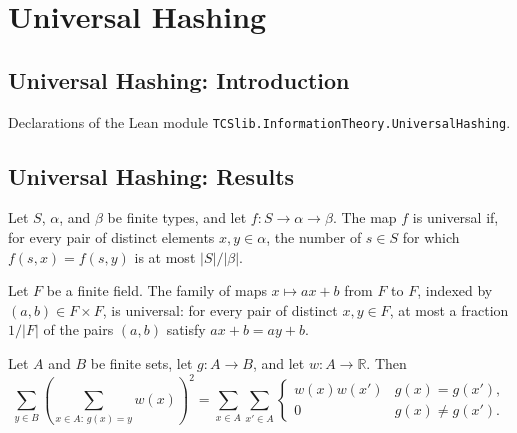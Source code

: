 \section{Universal Hashing}
\subsection*{Universal Hashing: Introduction}

Declarations of the Lean module \texttt{TCSlib.InformationTheory.UniversalHashing}.

\subsection*{Universal Hashing: Results}

\begin{definition}
\label{TCSlib.InformationTheory.IsUniversal}
\leanok
Let $S$, $\alpha$, and $\beta$ be finite types, and let $f:S\to\alpha\to\beta$. The map
$f$ is universal if, for every pair of distinct elements $x,y\in\alpha$, the number of
$s\in S$ for which $f(s,x)=f(s,y)$ is at most $|S|/|\beta|$.
\end{definition}

\begin{theorem}
\label{TCSlib.InformationTheory.isUniversal_affine}
\leanok
{}
Let $F$ be a finite field. The family of maps $x\mapsto ax+b$ from $F$ to $F$, indexed
by $(a,b)\in F\times F$, is universal: for every pair of distinct $x,y\in F$, at most a
fraction $1/|F|$ of the pairs $(a,b)$ satisfy $ax+b=ay+b$.
\end{theorem}

\begin{theorem}
\label{TCSlib.InformationTheory.sum_sq_fiber}
\leanok
{}
Let $A$ and $B$ be finite sets, let $g:A\to B$, and let $w:A\to\mathbb{R}$. Then
\[\sum_{y\in B}\left(\sum_{x\in A:\,g(x)=y}w(x)\right)^2=\sum_{x\in A}\sum_{x'\in A}\begin{cases}w(x)w(x')&g(x)=g(x'),\\0&g(x)\ne g(x').\end{cases}\]
\end{theorem}
